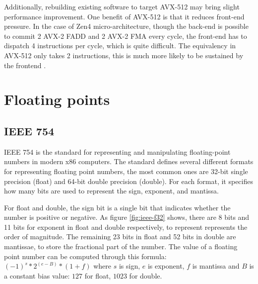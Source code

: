 \documentclass[logo,bsc,singlespacing,parskip]{infthesis}
\begin{document}
Additionally, rebuilding existing software to target AVX-512 may bring slight
performance improvement. One benefit of AVX-512 is that it reduces front-end
pressure. In the case of Zen4 micro-architecture, though the back-end is
possible to commit 2 AVX-2 FADD and 2 AVX-2 FMA every cycle, the front-end
has to dispatch 4 instructions per cycle, which is quite difficult. The
equivalency in AVX-512 only takes 2 instructions, this is much more likely to be
sustained by the frontend \cite{Zen4Critique}.


\section{Floating points}
\label{sec:i23}
\subsection{IEEE 754}
IEEE 754 is the standard for representing and manipulating floating-point
numbers in modern x86 computers. The standard defines several different formats
for representing floating point numbers, the most common ones are 32-bit single
precision (float) and 64-bit double precision (double). For each format, it
specifies how many bits are used to represent the sign, exponent, and mantissa. 

For float and double, the sign bit is a single bit that indicates whether the
number is positive or negative. As figure \ref{fig:ieee-f32} shows, there are 8
bits and 11 bits for exponent in float and double respectively, to represent
represents the order of magnitude. The remaining 23 bits in float and 52 bits in
double are mantissae, to store the fractional part of the number. The value of a
floating point number can be computed through this formula: 
\begin{math} (-1)^s * 2^{(e - B)} * (1 + f)\end{math}
where \begin{math}s\end{math} is sign, \begin{math}e\end{math} is exponent, 
\begin{math}f\end{math} is mantissa and \begin{math}B\end{math} is a constant bias
value: \begin{math}127\end{math} for float, \begin{math}1023\end{math} for double. 
\end{document}
